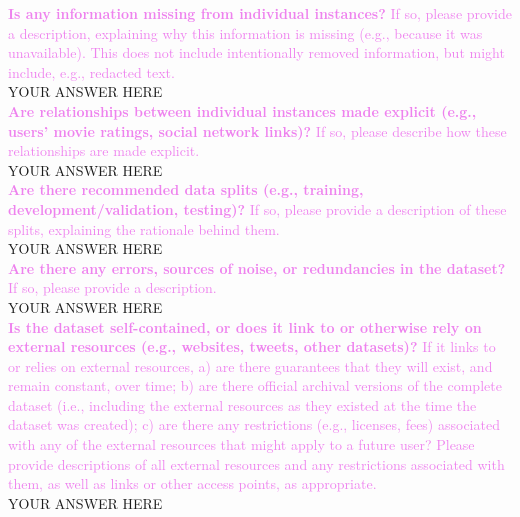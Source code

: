 \documentclass[letterpaper, 10 pt, conference]{ieeeconf}  %
\newcommand{\sectioncolor}{violet}
\begin{document}
    \textcolor{\sectioncolor}{\textbf{
    Is any information missing from individual instances?
    }
    If so, please provide a description, explaining why this information is
    missing (e.g., because it was unavailable). This does not include
    intentionally removed information, but might include, e.g., redacted text.
    } \\
    YOUR ANSWER HERE \\
    
    \textcolor{\sectioncolor}{\textbf{
    Are relationships between individual instances made explicit (e.g., users’
    movie ratings, social network links)?
    }
    If so, please describe how these relationships are made explicit.
    } \\
    YOUR ANSWER HERE \\
    
    \textcolor{\sectioncolor}{\textbf{
    Are there recommended data splits (e.g., training, development/validation,
    testing)?
    }
    If so, please provide a description of these splits, explaining the
    rationale behind them.
    } \\
    YOUR ANSWER HERE \\
    
    \textcolor{\sectioncolor}{\textbf{
    Are there any errors, sources of noise, or redundancies in the dataset?
    }
    If so, please provide a description.
    } \\
    YOUR ANSWER HERE \\
    
    \textcolor{\sectioncolor}{\textbf{
    Is the dataset self-contained, or does it link to or otherwise rely on
    external resources (e.g., websites, tweets, other datasets)?
    }
    If it links to or relies on external resources, a) are there guarantees
    that they will exist, and remain constant, over time; b) are there official
    archival versions of the complete dataset (i.e., including the external
    resources as they existed at the time the dataset was created); c) are
    there any restrictions (e.g., licenses, fees) associated with any of the
    external resources that might apply to a future user? Please provide
    descriptions of all external resources and any restrictions associated with
    them, as well as links or other access points, as appropriate.
    } \\
    YOUR ANSWER HERE \\
    
\end{document}

